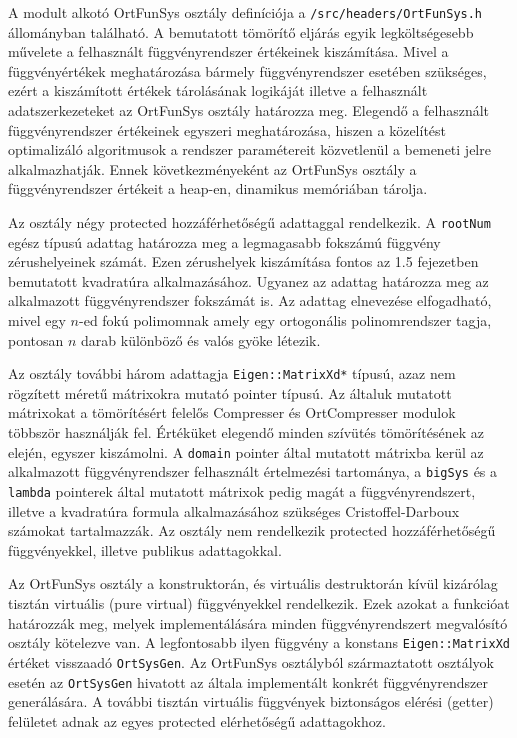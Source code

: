 \documentclass[oneside,titlepage,12pt,a4paper]{report}
\begin{document}
\par  A modult alkotó OrtFunSys osztály definíciója a \texttt{/src/headers/OrtFunSys.h} állományban található. A bemutatott tömörítő eljárás egyik legköltségesebb művelete
a felhasznált függvényrendszer értékeinek kiszámítása. Mivel a függvényértékek meghatározása bármely függvényrendszer esetében szükséges, ezért a kiszámított értékek
tárolásának logikáját illetve a felhasznált adatszerkezeteket az OrtFunSys osztály határozza meg. Elegendő a felhasznált függvényrendszer értékeinek egyszeri meghatározása, hiszen a közelítést optimalizáló algoritmusok 
a rendszer paramétereit közvetlenül a bemeneti jelre alkalmazhatják. Ennek következményeként az OrtFunSys osztály a függvényrendszer értékeit a heap-en, dinamikus memóriában tárolja.
\par Az osztály négy protected hozzáférhetőségű adattaggal rendelkezik. A \texttt{rootNum} egész típusú adattag határozza meg a legmagasabb fokszámú függvény zérushelyeinek számát. Ezen zérushelyek kiszámítása fontos az 1.5 fejezetben bemutatott kvadratúra alkalmazásához. Ugyanez az adattag határozza meg az alkalmazott függvényrendszer fokszámát is. Az adattag elnevezése elfogadható, mivel egy $n$-ed fokú polimomnak amely egy ortogonális polinomrendszer tagja, pontosan $n$ darab különböző és valós gyöke létezik.
\par Az osztály további három adattagja \texttt{Eigen::MatrixXd*} típusú, azaz nem rögzített méretű mátrixokra mutató pointer típusú. Az általuk mutatott mátrixokat a tömörítésért felelős Compresser és OrtCompresser modulok többször használják fel. Értéküket elegendő minden szívütés tömörítésének az elején, egyszer kiszámolni.  A \texttt{domain} pointer által mutatott mátrixba kerül az alkalmazott függvényrendszer felhasznált értelmezési tartománya, a \texttt{bigSys} és a \texttt{lambda} pointerek által mutatott mátrixok pedig magát a függvényrendszert, illetve a kvadratúra formula alkalmazásához szükséges Cristoffel-Darboux számokat tartalmazzák. Az osztály nem rendelkezik protected hozzáférhetőségű függvényekkel, illetve publikus adattagokkal.
\par Az OrtFunSys osztály a konstruktorán, és virtuális destruktorán kívül kizárólag tisztán virtuális (pure virtual) függvényekkel rendelkezik. Ezek azokat a funkcióat határozzák meg, melyek implementálására minden függvényrendszert megvalósító osztály kötelezve van. A legfontosabb ilyen függvény a konstans \texttt{Eigen::MatrixXd} értéket visszaadó \texttt{OrtSysGen}. Az OrtFunSys osztályból származtatott osztályok esetén az \texttt{OrtSysGen} hivatott az általa implementált konkrét függvényrendszer generálására. A további tisztán virtuális függvények biztonságos elérési (getter) felületet adnak az egyes protected elérhetőségű adattagokhoz. 
\end{document}
